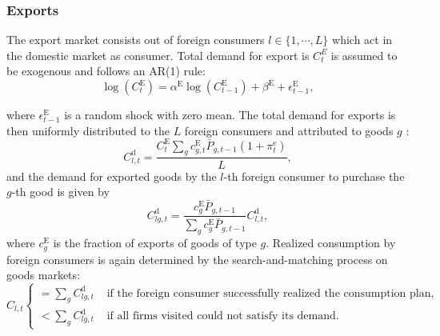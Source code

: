 \subsubsection{Exports}
The export market consists out of foreign consumers $l\in \{1,\cdots,L\}$ which act in the domestic market as consumer. Total demand for export is $C^E_t$ is assumed to be exogenous and follows an AR(1) rule:
\begin{equation}
    \log \left(C^{\mathrm{E}}_t\right)=\alpha^{\mathrm{E}} \log \left(C^{\mathrm{E}}_{t-1}\right)+\beta^{\mathrm{E}}+\epsilon^{\mathrm{E}}_{t-1}, \label{eq:exportsar}
\end{equation}

where $\epsilon^{\mathrm{E}}_{t-1}$ is a random shock with zero mean. The total demand for exports is then uniformly distributed to the $L$ foreign consumers and attributed to goods $g$ :
\begin{equation}
    C_{l,t}^{\mathrm{d}}=\frac{C^{\mathrm{E}}_t \sum_g c_{g,t}^{\mathrm{E}} \bar{P}_{g,t-1}\left(1+\pi^{\mathrm{e}}_t\right)}{L},
\end{equation}
and the demand for exported goods by the $l$-th foreign consumer to purchase the $g$-th good is given by
\begin{equation}
    C_{l g,t}^{\mathrm{d}}=\frac{c_g^{\mathrm{E}} \bar{P}_{g,t-1}}{\sum_g c_g^{\mathrm{E}} \bar{P}_{g,t-1}} C_{l,t}^{\mathrm{d}},
\end{equation}
where $c_g^{\mathrm{E}}$ is the fraction of exports of goods of type $g$. Realized consumption by foreign consumers is again determined by the search-and-matching process on goods markets:
\begin{equation}
    C_{l,t}\begin{cases}=\sum_g C_{l g,t}^{\mathrm{d}} & \text { if the foreign consumer successfully realized the consumption plan, and } \\ <\sum_g C_{l g,t}^{\mathrm{d}} & \text { if all firms visited could not satisfy its demand. }\end{cases}
\end{equation}
